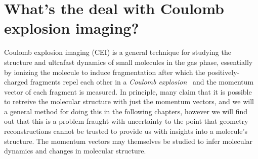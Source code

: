 

\section{What's the deal with Coulomb explosion imaging?}
Coulomb explosion imaging (CEI) is a general technique for studying the structure and ultrafast dynamics of small molecules in the gas phase, essentially by ionizing the molecule to induce fragmentation after which the positively-charged fragments repel each other in a \emph{Coulomb explosion}\footnotemark~ and the momentum vector of each fragment is measured. In principle, many claim that it is possible to retreive the molecular structure with just the momentum vectors, and we will a general method for doing this in the following chapters, however we will find out that this is a problem fraught with uncertainty to the point that geometry reconstructions cannot be trusted to provide us with insights into a molecule's structure. The momentum vectors may themselves be studied to infer molecular dynamics and changes in molecular structure.

